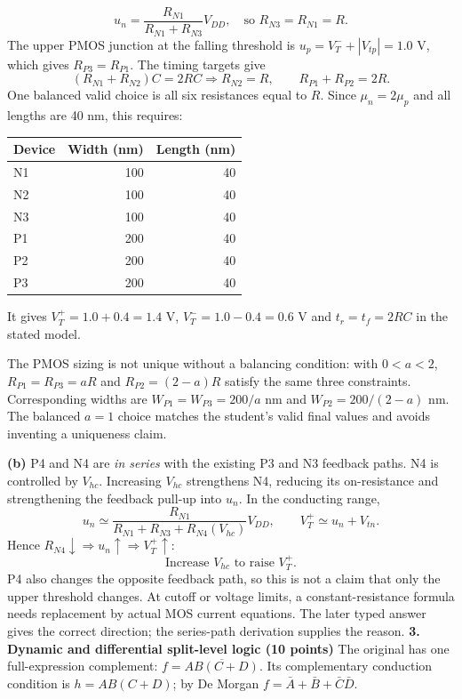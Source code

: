 \documentclass[10pt]{article}
\begin{document}
\[u_n=\frac{R_{N1}}{R_{N1}+R_{N3}}V_{DD},\quad\text{so }R_{N3}=R_{N1}=R.\]
The upper PMOS junction at the falling threshold is $u_p=V_T^-+|V_{tp}|=1.0$ V, which gives $R_{P3}=R_{P1}$. The timing targets give
\[(R_{N1}+R_{N2})C=2RC\Rightarrow R_{N2}=R,\qquad R_{P1}+R_{P2}=2R.\]
One balanced valid choice is all six resistances equal to $R$. Since $\mu_n=2\mu_p$ and all lengths are 40 nm, this requires:
\begin{center}\begin{tabular}{lrr}\toprule Device & Width (nm) & Length (nm)\\\midrule N1 &100&40\\N2&100&40\\N3&100&40\\P1&200&40\\P2&200&40\\P3&200&40\\\bottomrule\end{tabular}\end{center}
It gives $V_T^+=1.0+0.4=1.4$ V, $V_T^-=1.0-0.4=0.6$ V and $t_r=t_f=2RC$ in the stated model.

The PMOS sizing is not unique without a balancing condition: with $0<a<2$, $R_{P1}=R_{P3}=aR$ and $R_{P2}=(2-a)R$ satisfy the same three constraints. Corresponding widths are $W_{P1}=W_{P3}=200/a$ nm and $W_{P2}=200/(2-a)$ nm. The balanced $a=1$ choice matches the student's valid final values and avoids inventing a uniqueness claim.

\textbf{(b)} P4 and N4 are \emph{in series} with the existing P3 and N3 feedback paths. N4 is controlled by $V_{hc}$. Increasing $V_{hc}$ strengthens N4, reducing its on-resistance and strengthening the feedback pull-up into $u_n$. In the conducting range,
\[u_n\simeq\frac{R_{N1}}{R_{N1}+R_{N3}+R_{N4}(V_{hc})}V_{DD},\qquad V_T^+\simeq u_n+V_{tn}.\]
Hence $R_{N4}\downarrow\Rightarrow u_n\uparrow\Rightarrow V_T^+\uparrow$:
\[\boxed{\text{Increase }V_{hc}\text{ to raise }V_T^+.}\]
P4 also changes the opposite feedback path, so this is not a claim that only the upper threshold changes. At cutoff or voltage limits, a constant-resistance formula needs replacement by actual MOS current equations. The later typed answer gives the correct direction; the series-path derivation supplies the reason.
\newpage
\textbf{3. Dynamic and differential split-level logic (10 points)}
The original has one full-expression complement: $f=\overline{AB(C+D)}$. Its complementary conduction condition is $h=AB(C+D)$; by De Morgan $f=\bar A+\bar B+\bar C\bar D$.
\end{document}
